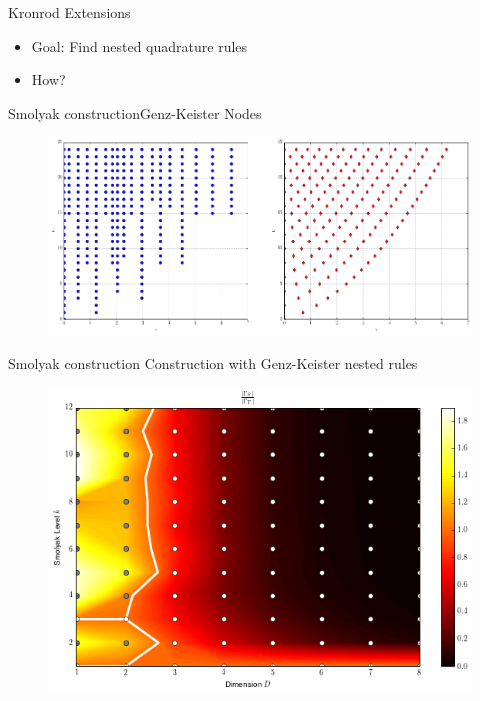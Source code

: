 \documentclass{beamer}
\begin{document}

\begin{frame}{Kronrod Extensions}
  \begin{itemize}
    \item Goal: Find nested quadrature rules
    \item How?
  \end{itemize}
\end{frame}




\begin{frame}{Smolyak construction}{Genz-Keister Nodes}
  \begin{figure}
    \centering
    \includegraphics[width=\linewidth]{./fig/genz_keister_nodes.png}
  \end{figure}
\end{frame}

\begin{frame}{Smolyak construction}
  Construction with Genz-Keister nested rules
  \begin{figure}
    \centering
    \includegraphics[width=0.8\linewidth]{./fig/smolyak_genzkeister_ratiomap.png}
  \end{figure}
\end{frame}
\end{document}
